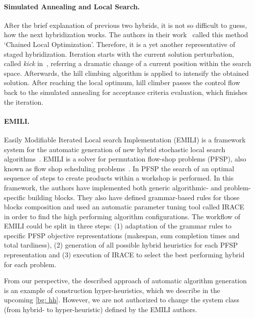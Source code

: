 \paragraph{Simulated Annealing and Local Search.}
After the brief explanation of previous two hybrids, it is not so difficult to guess, how the next hybridization works.
The authors in their work~\cite{martin1996combining} called this method `Chained Local Optimization'. Therefore, it is a yet another representative of staged hybridization.
Iteration starts with the current solution perturbation, called \emph{kick} in~\cite{martin1996combining}, referring a dramatic change of a current position within the search space. Afterwards, the hill climbing algorithm is applied to intensify the obtained solution. After reaching the local optimum, hill climber passes the control flow back to the simulated annealing for acceptance criteria evaluation, which finishes the iteration.

\paragraph{EMILI.}
Easily Modifiable Iterated Local search Implementation (EMILI) is a framework system for the automatic generation of new hybrid stochastic local search algorithms~\cite{pagnozzi2019automatic}. EMILI is a solver for permutation flow-shop problems (PFSP), also known as flow shop scheduling problems~\cite{reza2005flowshop}. In PFSP the search of an optimal sequence of steps to create products within a workshop is performed.
In this framework, the authors have implemented both generic algorithmic- and problem-specific building blocks. They also have defined grammar-based rules for those blocks composition and used an automatic parameter tuning tool called IRACE~\cite{lopez2016irace} in order to find the high performing algorithm configurations. The workflow of EMILI could be split in three steps: (1) adaptation of the grammar rules to specific PFSP objective representations (makespan, sum completion times and total tardiness), (2) generation of all possible hybrid heuristics for each PFSP representation and (3) execution of IRACE to select the best performing hybrid for each problem. 

From our perspective, the described approach of automatic algorithm generation is an example of construction hyper-heuristics, which we describe in the upcoming \cref{bg: hh}. However, we are not authorized to change the system class (from hybrid- to hyper-heuristic) defined by the EMILI authors.


